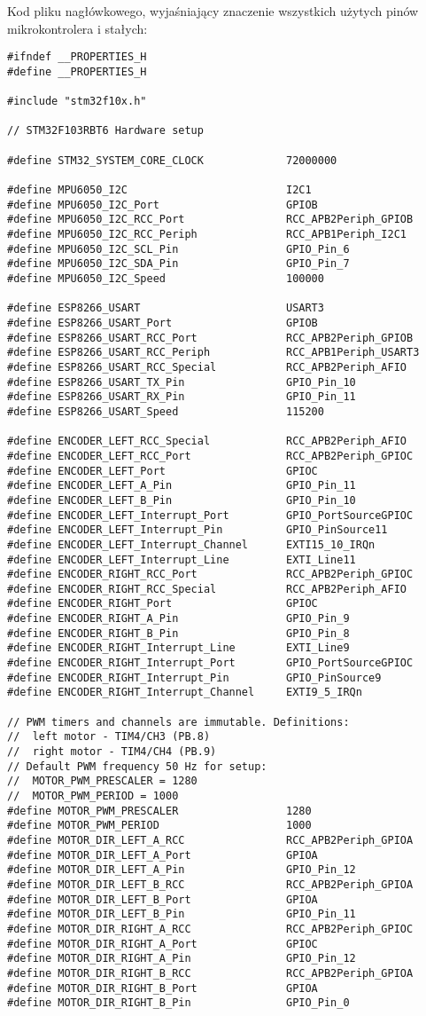 \documentclass[a4paper,12pt,twoside,openany]{report}
\begin{document}
Kod pliku nagłówkowego, wyjaśniający znaczenie wszystkich użytych pinów mikrokontrolera i stałych:\\
\begin{lstlisting}[style=customc]
#ifndef __PROPERTIES_H
#define __PROPERTIES_H

#include "stm32f10x.h"

// STM32F103RBT6 Hardware setup

#define STM32_SYSTEM_CORE_CLOCK				72000000

#define MPU6050_I2C                 		I2C1
#define MPU6050_I2C_Port            		GPIOB
#define MPU6050_I2C_RCC_Port        		RCC_APB2Periph_GPIOB
#define MPU6050_I2C_RCC_Periph      		RCC_APB1Periph_I2C1
#define MPU6050_I2C_SCL_Pin         		GPIO_Pin_6
#define MPU6050_I2C_SDA_Pin        			GPIO_Pin_7
#define MPU6050_I2C_Speed          			100000

#define ESP8266_USART						USART3
#define ESP8266_USART_Port					GPIOB
#define ESP8266_USART_RCC_Port				RCC_APB2Periph_GPIOB
#define ESP8266_USART_RCC_Periph			RCC_APB1Periph_USART3
#define ESP8266_USART_RCC_Special			RCC_APB2Periph_AFIO
#define ESP8266_USART_TX_Pin				GPIO_Pin_10
#define ESP8266_USART_RX_Pin				GPIO_Pin_11
#define ESP8266_USART_Speed					115200

#define ENCODER_LEFT_RCC_Special			RCC_APB2Periph_AFIO
#define ENCODER_LEFT_RCC_Port				RCC_APB2Periph_GPIOC
#define ENCODER_LEFT_Port					GPIOC
#define ENCODER_LEFT_A_Pin					GPIO_Pin_11
#define ENCODER_LEFT_B_Pin					GPIO_Pin_10
#define ENCODER_LEFT_Interrupt_Port			GPIO_PortSourceGPIOC
#define ENCODER_LEFT_Interrupt_Pin			GPIO_PinSource11
#define ENCODER_LEFT_Interrupt_Channel		EXTI15_10_IRQn
#define ENCODER_LEFT_Interrupt_Line			EXTI_Line11
#define ENCODER_RIGHT_RCC_Port				RCC_APB2Periph_GPIOC
#define ENCODER_RIGHT_RCC_Special			RCC_APB2Periph_AFIO
#define ENCODER_RIGHT_Port					GPIOC
#define ENCODER_RIGHT_A_Pin					GPIO_Pin_9
#define ENCODER_RIGHT_B_Pin					GPIO_Pin_8
#define ENCODER_RIGHT_Interrupt_Line		EXTI_Line9
#define ENCODER_RIGHT_Interrupt_Port		GPIO_PortSourceGPIOC
#define ENCODER_RIGHT_Interrupt_Pin			GPIO_PinSource9
#define ENCODER_RIGHT_Interrupt_Channel		EXTI9_5_IRQn

// PWM timers and channels are immutable. Definitions:
// 	left motor - TIM4/CH3 (PB.8)
// 	right motor - TIM4/CH4 (PB.9)
// Default PWM frequency 50 Hz for setup:
//  MOTOR_PWM_PRESCALER = 1280
//  MOTOR_PWM_PERIOD = 1000
#define MOTOR_PWM_PRESCALER					1280
#define MOTOR_PWM_PERIOD					1000
#define MOTOR_DIR_LEFT_A_RCC				RCC_APB2Periph_GPIOA
#define MOTOR_DIR_LEFT_A_Port				GPIOA
#define MOTOR_DIR_LEFT_A_Pin				GPIO_Pin_12
#define MOTOR_DIR_LEFT_B_RCC				RCC_APB2Periph_GPIOA
#define MOTOR_DIR_LEFT_B_Port				GPIOA
#define MOTOR_DIR_LEFT_B_Pin				GPIO_Pin_11
#define MOTOR_DIR_RIGHT_A_RCC				RCC_APB2Periph_GPIOC
#define MOTOR_DIR_RIGHT_A_Port				GPIOC
#define MOTOR_DIR_RIGHT_A_Pin				GPIO_Pin_12
#define MOTOR_DIR_RIGHT_B_RCC				RCC_APB2Periph_GPIOA
#define MOTOR_DIR_RIGHT_B_Port				GPIOA
#define MOTOR_DIR_RIGHT_B_Pin				GPIO_Pin_0


\end{lstlisting}
\end{document}
